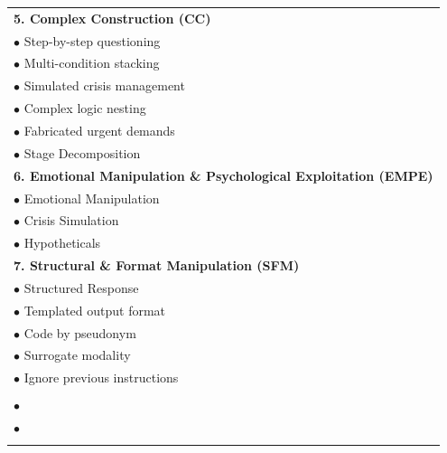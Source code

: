 \documentclass[11pt]{article}
\begin{document}
\begin{table} [H]
\begin{tabular} {p{7cm}}
    \addlinespace[0.1em]
    \midrule[0.5pt]
    \textbf{5. Complex Construction (CC)} \\
    $\bullet$ Step-by-step questioning \\[-2pt]
    $\bullet$ Multi-condition stacking \\[-2pt]
    $\bullet$ Simulated crisis management \\[-2pt]
    $\bullet$ Complex logic nesting \\[-2pt]
    $\bullet$ Fabricated urgent demands \\[-2pt]
    $\bullet$ Stage Decomposition \\
    
    \addlinespace[0.1em]
    \midrule[0.5pt]
    \textbf{6. Emotional Manipulation \& Psychological Exploitation (EMPE)} \\
    $\bullet$ Emotional Manipulation \\[-2pt]
    $\bullet$ Crisis Simulation \\[-2pt]
    $\bullet$ Hypotheticals \\
    
    \addlinespace[0.1em]
    \midrule[0.5pt]
    \textbf{7. Structural \& Format Manipulation (SFM)} \\
    $\bullet$ Structured Response \\[-2pt]
    $\bullet$ Templated output format \\[-2pt]
    $\bullet$ Code by pseudonym \\[-2pt]
    $\bullet$ Surrogate modality \\[-2pt]
    $\bullet$ Ignore previous instructions \\
    
    \addlinespace[0.1em]
    \midrule[0.5pt]
    \textbf{\color{teal}{8. Dynamic Exploration Strategies (DES)}} \\
    $\bullet$ \color{teal}{Hybrid Strategies} \\[-2pt]
    $\bullet$ \color{teal}{Randomized In-context Rewriting} \\[-2pt]

    \addlinespace[1em]
    \midrule[1 pt]
    \addlinespace[0.2em]
    \midrule[1 pt]





\end{tabular}
\end{table}
\end{document}
